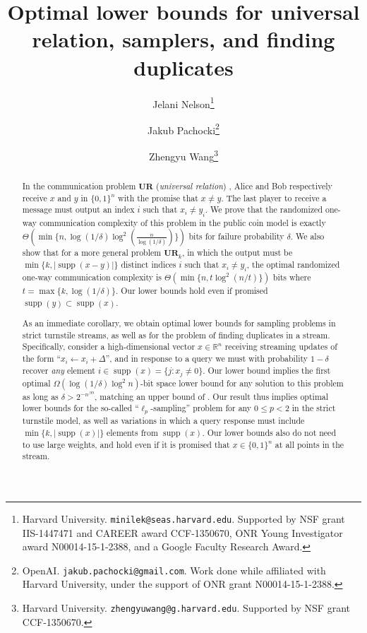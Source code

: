 \documentclass[11pt]{article}
\title{Optimal lower bounds for universal relation, samplers, and finding duplicates}
\author{Jelani Nelson\thanks{Harvard University. \texttt{minilek@seas.harvard.edu}. Supported by NSF grant IIS-1447471 and
   CAREER award CCF-1350670, ONR Young Investigator award N00014-15-1-2388, and a Google Faculty Research Award.}
  \and Jakub Pachocki\thanks{OpenAI. \texttt{jakub.pachocki@gmail.com}. Work done while affiliated with Harvard University, under the support of ONR grant N00014-15-1-2388.}
  \and Zhengyu Wang\thanks{Harvard University. \texttt{zhengyuwang@g.harvard.edu}. Supported by NSF grant CCF-1350670.}}
\newcommand{\supp}{\mathop{supp}}
\newcommand{\R}{\mathbb{R}}
\newcommand{\ur}{\mathbf{UR}\xspace}
\begin{document}
\setcounter{page}{0}

\maketitle

\thispagestyle{empty}

\begin{abstract}
In the communication problem $\ur$ ({\em universal relation}) \cite{KarchmerRW95}, Alice and Bob respectively receive $x$ and $y$ in $\{0,1\}^n$ with the promise that $x\neq y$. The last player to receive a message must output an index $i$ such that $x_i\neq y_i$. We prove that the randomized one-way communication complexity of this problem in the public coin model is exactly $\Theta(\min\{n, \log(1/\delta)\log^2(\frac{n}{\log(1/\delta)})\})$ bits for failure probability $\delta$.  We also show that for a more general problem $\ur_k$, in which the output must be $\min\{k, |\supp(x-y)|\}$ distinct indices $i$ such that $x_i\neq y_i$, the optimal randomized one-way communication complexity is $\Theta(\min\{n, t\log^2(n/t)\})$ bits where $t = \max\{k, \log(1/\delta)\}$. Our lower bounds hold even if promised $\supp(y)\subset \supp(x)$.

As an immediate corollary, we obtain optimal lower bounds for sampling problems in strict turnstile streams, as well as for the problem of finding duplicates in a stream.  Specifically, consider a high-dimensional vector $x\in\R^n$ receiving streaming updates of the form ``$x_i\leftarrow x_i + \Delta$'', and in response to a query we must with probability $1-\delta$ recover {\em any} element $i\in\supp(x) = \{j : x_j \neq 0\}$. Our lower bound implies the first optimal $\Omega(\log(1/\delta)\log^2 n)$-bit space lower bound for any solution to this problem as long as $\delta > 2^{-n^{.99}}$, matching an upper bound of \cite{JowhariST11}. Our result thus implies optimal lower bounds for the so-called ``$\ell_p$-sampling'' problem for any $0\le p < 2$ in the strict turnstile model, as well as variations in which a query response must include $\min\{k, |\supp(x)|\}$ elements from $\supp(x)$.  Our lower bounds also do not need to use large weights, and hold even if it is promised that $x\in\{0,1\}^n$ at all points in the stream.



\end{abstract}
\end{document}
